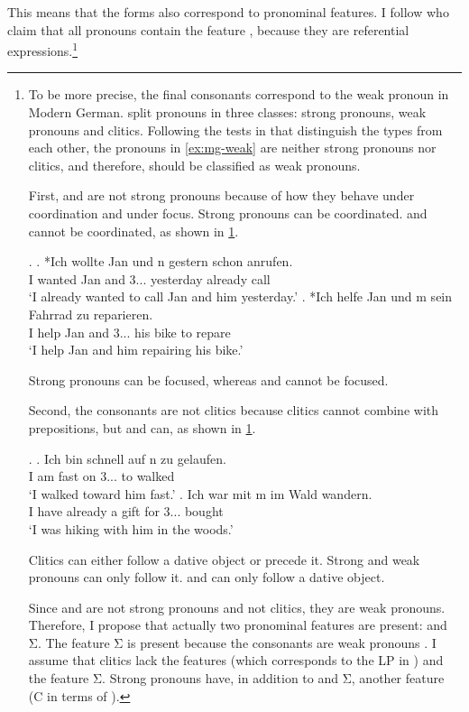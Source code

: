 This means that the forms also correspond to pronominal features.
I follow \citet{harley2002} who claim that all pronouns contain the feature , because they are referential expressions.\footnote{

To be more precise, the final consonants correspond to the weak pronoun in Modern German. \citet{cardinaletti1994} split pronouns in three classes: strong pronouns, weak pronouns and clitics. Following the tests in \citet{cardinaletti1994} that distinguish the types from each other, the pronouns in \ref{ex:mg-weak} are neither strong pronouns nor clitics, and therefore, should be classified as weak pronouns.

First,  and  are not strong pronouns because of how they behave under coordination and under focus.
Strong pronouns can be coordinated.  and  cannot be coordinated, as shown in \ref{ex:wk-pron-coord}.

\ex.\label{ex:wk-pron-coord}
\ag. *Ich wollte Jan und n gestern schon anrufen.\\
 I wanted Jan and 3... yesterday already call\\
 `I already wanted to call Jan and him yesterday.'
\bg. *Ich helfe Jan und m sein Fahrrad zu reparieren.\\
 I help Jan and 3... his bike to repare\\
 `I help Jan and him repairing his bike.'

Strong pronouns can be focused, whereas  and  cannot be focused.

Second, the consonants are not clitics because clitics cannot combine with prepositions, but  and  can, as shown in \ref{ex:wk-pron-prep}.

\ex.\label{ex:wk-pron-prep}
\ag. Ich bin schnell auf n zu gelaufen.\\
 I am fast on 3... to walked\\
 `I walked toward him fast.'
\bg. Ich war mit m im Wald wandern.\\
 I have already a gift for 3... bought\\
 `I was hiking with him in the woods.'

Clitics can either follow a dative object or precede it. Strong and weak pronouns can only follow it.  and  can only follow a dative object.

Since  and  are not strong pronouns and not clitics, they are weak pronouns.
Therefore, I propose that actually two pronominal features are present:  and Σ. The feature Σ is present because the consonants are weak pronouns \citep{cardinaletti1994}.
I assume that clitics lack the features  (which corresponds to the LP in ) and the feature Σ. Strong pronouns have, in addition to  and Σ, another feature (C in terms of ).
}

